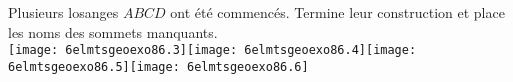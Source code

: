 Plusieurs losanges $ABCD$ ont été commencés. Termine leur construction et place les noms des sommets manquants.\\
\texttt{[image: 6elmtsgeoexo86.3]}\hfill\texttt{[image: 6elmtsgeoexo86.4]}\hfill\texttt{[image: 6elmtsgeoexo86.5]}\hfill\texttt{[image: 6elmtsgeoexo86.6]}